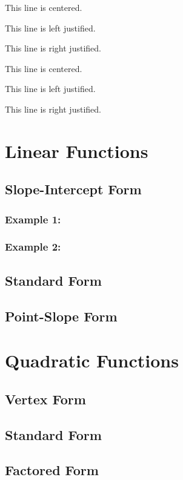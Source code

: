 \documentclass[11pt]{article}
\begin{document}
\begin{center}This line is centered.\end{center}
\begin{flushleft}This line is left justified.\end{flushleft}
\begin{flushright}This line is right justified.\end{flushright}

\tiny

This line is centered.

This line is left justified.

This line is right justified.

\section{Linear Functions}
    \subsection{Slope-Intercept Form}
        \subsubsection{Example 1:}
        \subsubsection{Example 2:}
    \subsection{Standard Form}
    \subsection{Point-Slope Form}
\section{Quadratic Functions}
    \subsection{Vertex Form}
    \subsection{Standard Form}
    \subsection{Factored Form}
\end{document}
